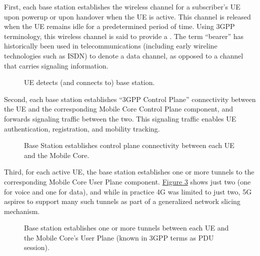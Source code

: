 \documentclass[a4paper,11pt,english]{sphinxmanual}
\let\sphinxpxdimen\pdfpxdimen\else\newdimen\sphinxpxdimen
\begin{document}
\sphinxAtStartPar
First, each base station establishes the wireless channel for a
subscriber’s UE upon power\sphinxhyphen{}up or upon handover when the UE is active.
This channel is released when the UE remains idle for a predetermined
period of time. Using 3GPP terminology, this wireless channel is said
to provide a . The term “bearer” has historically been
used in telecommunications (including early wireline technologies such
as ISDN) to denote a data channel, as opposed to a channel that carries
signaling information.

\begin{figure}[ht]
\centering
\capstart

\noindent\sphinxincludegraphics[width=500\sphinxpxdimen]{{Slide6}.png}
\caption{UE detects (and connects to) base station.}\label{\detokenize{arch:id7}}\label{\detokenize{arch:fig-active-ue}}\end{figure}

\sphinxAtStartPar
Second, each base station establishes “3GPP Control Plane”
connectivity between the UE and the corresponding Mobile Core Control
Plane component, and forwards signaling traffic between the two. This
signaling traffic enables UE authentication, registration, and
mobility tracking.

\begin{figure}[ht]
\centering
\capstart

\noindent\sphinxincludegraphics[width=500\sphinxpxdimen]{{Slide7}.png}
\caption{Base Station establishes control plane connectivity
between each UE and the Mobile Core.}\label{\detokenize{arch:id8}}\label{\detokenize{arch:fig-control-plane}}\end{figure}

\sphinxAtStartPar
Third, for each active UE, the base station establishes one or more
tunnels to the corresponding Mobile Core User Plane component.
\hyperref[\detokenize{arch:fig-user-plane}]{Figure \ref{\detokenize{arch:fig-user-plane}}} shows just two (one for voice and
one for data), and while in practice 4G was limited to just two, 5G
aspires to support many such tunnels as part of a generalized network
slicing mechanism.

\begin{figure}[ht]
\centering
\capstart

\noindent\sphinxincludegraphics[width=500\sphinxpxdimen]{{Slide8}.png}
\caption{Base station establishes one or more tunnels between each UE and
the Mobile Core’s User Plane (known in 3GPP terms as PDU session).}\label{\detokenize{arch:id9}}\label{\detokenize{arch:fig-user-plane}}\end{figure}
\end{document}
